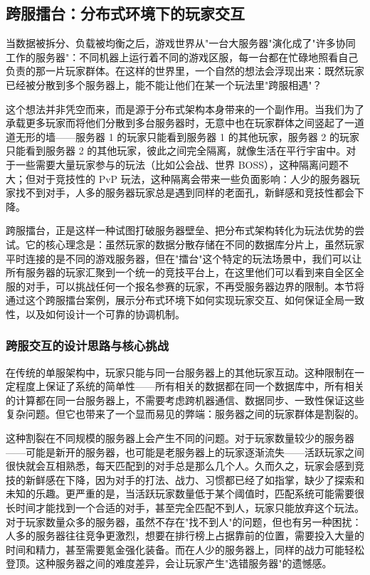 \subsection{跨服擂台：分布式环境下的玩家交互}

当数据被拆分、负载被均衡之后，游戏世界从"一台大服务器"演化成了"许多协同工作的服务器"：不同机器上运行着不同的游戏区服，每一台都在忙碌地照看自己负责的那一片玩家群体。在这样的世界里，一个自然的想法会浮现出来：既然玩家已经被分散到多个服务器上，能不能让他们在某一个玩法里"跨服相遇"？

这个想法并非凭空而来，而是源于分布式架构本身带来的一个副作用。当我们为了承载更多玩家而将他们分散到多台服务器时，无意中也在玩家群体之间竖起了一道道无形的墙——服务器 1 的玩家只能看到服务器 1 的其他玩家，服务器 2 的玩家只能看到服务器 2 的其他玩家，彼此之间完全隔离，就像生活在平行宇宙中。对于一些需要大量玩家参与的玩法（比如公会战、世界 BOSS），这种隔离问题不大；但对于竞技性的 PvP 玩法，这种隔离会带来一些负面影响：人少的服务器玩家找不到对手，人多的服务器玩家总是遇到同样的老面孔，新鲜感和竞技性都会下降。

跨服擂台，正是这样一种试图打破服务器壁垒、把分布式架构转化为玩法优势的尝试。它的核心理念是：虽然玩家的数据分散存储在不同的数据库分片上，虽然玩家平时连接的是不同的游戏服务器，但在"擂台"这个特定的玩法场景中，我们可以让所有服务器的玩家汇聚到一个统一的竞技平台上，在这里他们可以看到来自全区全服的对手，可以挑战任何一个报名参赛的玩家，不再受服务器边界的限制。本节将通过这个跨服擂台案例，展示分布式环境下如何实现玩家交互、如何保证全局一致性，以及如何设计一个可靠的协调机制。

\subsubsection{跨服交互的设计思路与核心挑战}

在传统的单服架构中，玩家只能与同一台服务器上的其他玩家互动。这种限制在一定程度上保证了系统的简单性——所有相关的数据都在同一个数据库中，所有相关的计算都在同一台服务器上，不需要考虑跨机器通信、数据同步、一致性保证这些复杂问题。但它也带来了一个显而易见的弊端：服务器之间的玩家群体是割裂的。

这种割裂在不同规模的服务器上会产生不同的问题。对于玩家数量较少的服务器——可能是新开的服务器，也可能是老服务器上的玩家逐渐流失——活跃玩家之间很快就会互相熟悉，每天匹配到的对手总是那么几个人。久而久之，玩家会感到竞技的新鲜感在下降，因为对手的打法、战力、习惯都已经了如指掌，缺少了探索和未知的乐趣。更严重的是，当活跃玩家数量低于某个阈值时，匹配系统可能需要很长时间才能找到一个合适的对手，甚至完全匹配不到人，玩家只能放弃这个玩法。对于玩家数量众多的服务器，虽然不存在"找不到人"的问题，但也有另一种困扰：人多的服务器往往竞争更激烈，想要在排行榜上占据靠前的位置，需要投入大量的时间和精力，甚至需要氪金强化装备。而在人少的服务器上，同样的战力可能轻松登顶。这种服务器之间的难度差异，会让玩家产生"选错服务器"的遗憾感。

